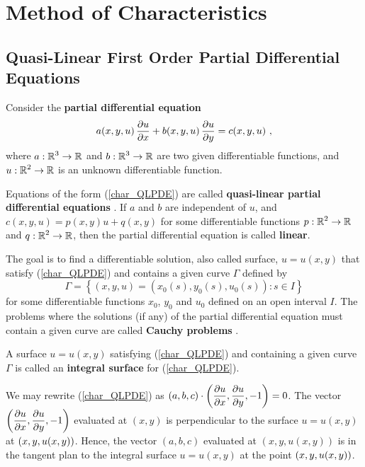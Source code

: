 \chapter{Method of Characteristics}\label{ChapCaract}

\section[Quasi-Linear First Order Equations]{Quasi-Linear First Order
Partial Differential Equations}

Consider the {\bfseries partial differential equation}
\begin{equation}\label{char_QLPDE}
a(x,y,u)\,\frac{\partial{u}}{\partial x} + b(x,y,u)\,\frac{\partial{u}}{\partial y} = c(x,y,u) \ ,
\end{equation}
where $\displaystyle a:\mathbb{R}^3\rightarrow \mathbb{R}$ and
$\displaystyle b:\mathbb{R}^3\rightarrow \mathbb{R}$ are
two given differentiable functions, and
$\displaystyle u:\mathbb{R}^2\rightarrow \mathbb{R}$ is an
unknown differentiable function.

Equations of the form (\ref{char_QLPDE}) are called
{\bfseries quasi-linear partial differential equations}%
.
If $a$ and $b$ are independent of $u$, and
$c(x,y,u) = p(x,y) u + q(x,y)$ for some differentiable functions
$\displaystyle p:\mathbb{R}^2\rightarrow \mathbb{R}$ and
$\displaystyle q:\mathbb{R}^2\rightarrow \mathbb{R}$, then the
partial differential equation is called
{\bfseries linear}.

The goal is to find a differentiable solution, also called surface,
$u=u(x,y)$ that satisfy (\ref{char_QLPDE}) and contains a given curve
$\Gamma$ defined by
\[
\Gamma = \left\{ (x,y,u) = \left(x_0(s), y_0(s),u_0(s)\right) : s\in I \right\}
\]
for some differentiable functions $x_0$, $y_0$ and $u_0$ defined on 
an open interval $I$.  The problems where the
solutions (if any) of the partial differential equation must contain a
given curve are called
{\bfseries Cauchy problems}%
.

\begin{defn}
A surface $u=u(x,y)$ satisfying (\ref{char_QLPDE}) and containing a
given curve $\Gamma$ is called an
{\bfseries integral surface}%
 for
(\ref{char_QLPDE}).
\end{defn}

We may rewrite (\ref{char_QLPDE}) as
$\displaystyle (a,b,c) \cdot \left(\frac{\partial{u}}{\partial x}, \frac{\partial{u}}{\partial y}, -1 \right) = 0$.
The vector $\displaystyle \left(\frac{\partial{u}}{\partial x}, \frac{\partial{u}}{\partial y}, -1 \right)$
evaluated at $(x,y)$ is perpendicular to the surface $u=u(x,y)$ at
$\displaystyle \left(x,y,u(x,y)\right)$.  Hence, the vector
$(a,b,c)$ evaluated at $(x,y,u(x,y))$ is in the tangent plan to the integral
surface $u=u(x,y)$ at the point $\displaystyle \left(x,y,u(x,y)\right)$.

